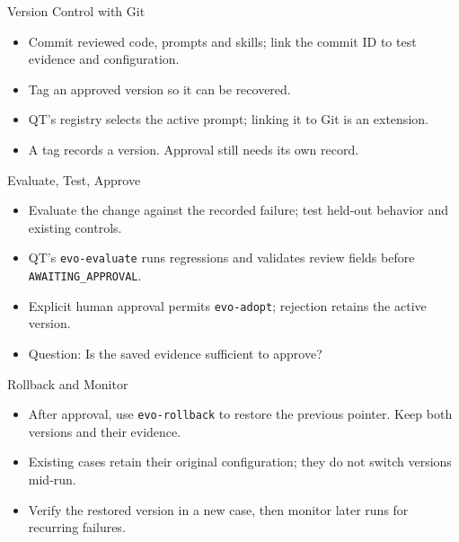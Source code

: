 \begin{frame}{Version Control with Git}
\begin{center}
\resizebox{.94\textwidth}{!}{}
\end{center}
\begin{itemize}
\item Commit reviewed code, prompts and skills; link the commit ID to test evidence and configuration.
\item Tag an approved version so it can be recovered.
\item QT's registry selects the active prompt; linking it to Git is an extension.
\item A tag records a version. Approval still needs its own record.
\end{itemize}
\end{frame}

\begin{frame}{Evaluate, Test, Approve\handsup}
\begin{center}
\resizebox{.94\textwidth}{!}{}
\end{center}
\begin{itemize}
\item Evaluate the change against the recorded failure; test held-out behavior and existing controls.
\item QT's \texttt{evo-evaluate} runs regressions and validates review fields before \texttt{AWAITING\_APPROVAL}.
\item Explicit human approval permits \texttt{evo-adopt}; rejection retains the active version.
\item Question: Is the saved evidence sufficient to approve?
\end{itemize}
\end{frame}

\begin{frame}{Rollback and Monitor}
\begin{center}
\resizebox{.94\textwidth}{!}{}
\end{center}
\begin{itemize}
\item After approval, use \texttt{evo-rollback} to restore the previous pointer. Keep both versions and their evidence.
\item Existing cases retain their original configuration; they do not switch versions mid-run.
\item Verify the restored version in a new case, then monitor later runs for recurring failures.
\end{itemize}
\end{frame}


